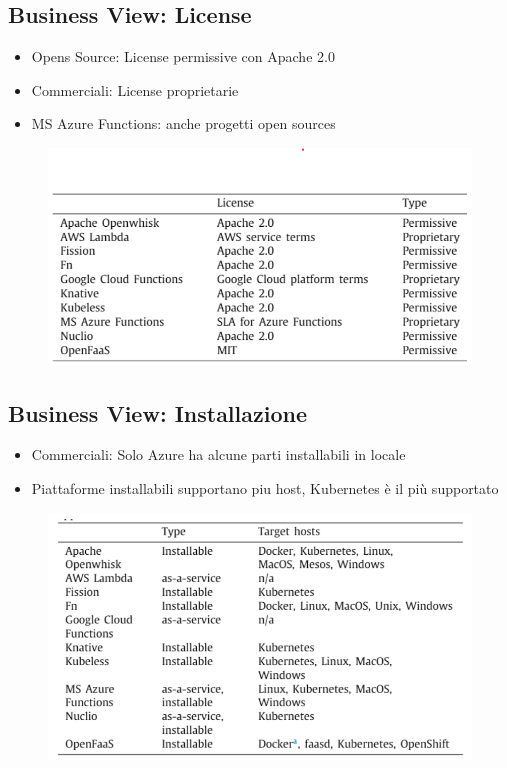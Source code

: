 \documentclass[a4paper, 12pt]{report}
\begin{document}
          \subsection{Business View: License}
            \begin{itemize}
              \item Opens Source: License permissive con Apache 2.0
              \item Commerciali: License proprietarie
              \item MS Azure Functions: anche progetti open sources
            \end{itemize}
            \begin{figure}[h]
              \centering
              \includegraphics[scale=0.4]{Immagini/License.png}
            \end{figure}
            \subsection{Business View: Installazione}
            \begin{itemize}
              \item Commerciali: Solo Azure ha alcune parti installabili in locale
              \item Piattaforme installabili supportano piu host, Kubernetes è il più supportato
            \end{itemize}
            \begin{figure}[h]
              \centering
              \includegraphics[scale=0.4]{Immagini/Installation.png}
            \end{figure}
            \clearpage
\end{document}
